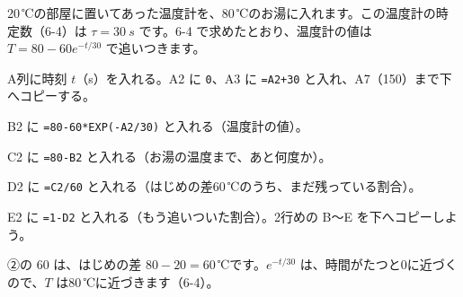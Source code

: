 \begin{yattemiyou}
20\,℃の部屋に置いてあった温度計を、80\,℃のお湯に入れます。この温度計の時定数（6-4）は $\tau=\qty{30}{s}$ です。6-4 で求めたとおり、温度計の値は $T=80-60e^{-t/30}$ で追いつきます。
\begin{enumerate}[label={\bkcircled[bkGreen]{\arabic*}}, leftmargin=2.4\zw, itemsep=1pt, topsep=3pt]
\item A列に時刻 $t$（s）を入れる。A2 に \texttt{0}、A3 に \texttt{=A2+30} と入れ、A7（150）まで下へコピーする。
\item B2 に \texttt{=80-60*EXP(-A2/30)} と入れる（温度計の値）。
\item C2 に \texttt{=80-B2} と入れる（お湯の温度まで、あと何度か）。
\item D2 に \texttt{=C2/60} と入れる（はじめの差60\,℃のうち、まだ残っている割合）。
\item E2 に \texttt{=1-D2} と入れる（もう追いついた割合）。2行めの B〜E を下へコピーしよう。
\end{enumerate}
\end{yattemiyou}

\noindent ②の $60$ は、はじめの差 $80-20=60$\,℃です。$e^{-t/30}$ は、時間がたつと0に近づくので、$T$ は80\,℃に近づきます（6-4）。

\begin{bkcenter}
\label{bk:9-9:tab-sheet}
\end{bkcenter}

